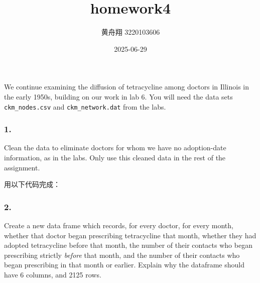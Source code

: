 \documentclass[
]{article}
\title{homework4}
\author{黄舟翔 3220103606}
\date{2025-06-29}
\newenvironment{Shaded}{\begin{snugshade}}{\end{snugshade}}
\newcommand{\FunctionTok}[1]{\textcolor[rgb]{0.13,0.29,0.53}{\textbf{#1}}}
\newcommand{\NormalTok}[1]{#1}
\newcommand{\OtherTok}[1]{\textcolor[rgb]{0.56,0.35,0.01}{#1}}
\newcommand{\SpecialCharTok}[1]{\textcolor[rgb]{0.81,0.36,0.00}{\textbf{#1}}}
\newcommand{\StringTok}[1]{\textcolor[rgb]{0.31,0.60,0.02}{#1}}
\begin{document}
\maketitle

We continue examining the diffusion of tetracycline among doctors in
Illinois in the early 1950s, building on our work in lab 6. You will
need the data sets \texttt{ckm\_nodes.csv} and \texttt{ckm\_network.dat}
from the labs.

\subsubsection{1.}\label{section}

Clean the data to eliminate doctors for whom we have no adoption-date
information, as in the labs. Only use this cleaned data in the rest of
the assignment.

用以下代码完成：

\begin{Shaded}
\end{Shaded}

\subsubsection{2.}\label{section-1}

Create a new data frame which records, for every doctor, for every
month, whether that doctor began prescribing tetracycline that month,
whether they had adopted tetracycline before that month, the number of
their contacts who began prescribing strictly \emph{before} that month,
and the number of their contacts who began prescribing in that month or
earlier. Explain why the dataframe should have 6 columns, and 2125 rows.
\end{document}
